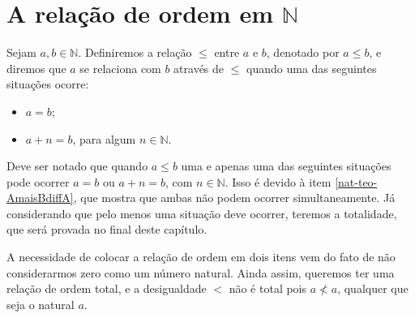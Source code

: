 \documentclass[../main.tex]{subfiles}
\begin{document}
\section{A relação de ordem em $\mathbb{N}$}
\begin{defi}\label{nat-def-relacaoOrdem}
Sejam $a, b \in \mathbb{N}$. Definiremos a relação $\leq$ entre $a$ e $b$, denotado por $a \leq b$, e diremos que $a$ se relaciona com $b$ através de $\leq$ quando uma das seguintes situações ocorre:
    \begin{itemize}
        \item $a = b$;
        \item $a + n = b$, para algum $n \in \mathbb{N}$.
    \end{itemize} 
\end{defi}
\begin{obs}
    Deve ser notado que quando $a \leq b$ uma e apenas uma das seguintes situações pode ocorrer $a = b$ ou $a + n = b$, com $n \in \mathbb{N}$. Isso é devido à  item \ref{nat-teo-AmaisBdiffA}, que mostra que ambas não podem ocorrer simultaneamente. Já considerando que pelo menos uma situação deve ocorrer, teremos a totalidade, que será provada no final deste capítulo. 
\end{obs}

A necessidade de colocar a relação de ordem em dois itens vem do fato de não considerarmos zero como um número natural. Ainda assim, queremos ter uma relação de ordem total, e a desigualdade $<$ não é total pois $a \not< a$, qualquer que seja o natural $a$.
\end{document}
